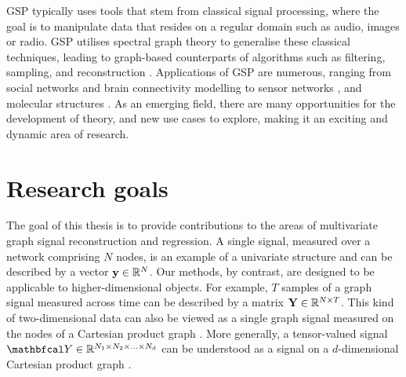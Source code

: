 \phantom{In this thesis we are  }
\vspace{-0.3cm}

GSP typically uses tools that stem from classical signal processing, where the goal is to manipulate data that resides on a regular domain such as audio, images or radio. GSP utilises spectral graph theory to generalise these classical techniques, leading to graph-based counterparts of algorithms such as filtering, sampling, and reconstruction \citep{Shuman2013}. Applications of GSP are numerous, ranging from social networks \citep{Dong2015} and brain connectivity modelling \citep{Huang2016} to sensor networks \citep{Zhu2012}, and molecular structures \citep{Kearnes2016}. As an emerging field, there are many opportunities for the development of theory, and new use cases to explore, making it an exciting and dynamic area of research. 

\section{Research goals}


The goal of this thesis is to provide contributions to the areas of multivariate graph signal reconstruction and regression. A single signal, measured over a network comprising $N$ nodes, is an example of a univariate structure and can be described by a vector $\mathbf{y} \in \mathbb{R}^N$. Our methods, by contrast, are designed to be applicable to higher-dimensional objects. For example, $T$ samples of a graph signal measured across time can be described by a matrix $\mathbf{Y} \in \mathbb{R}^{N \times T}$. This kind of two-dimensional data can also be viewed as a single graph signal measured on the nodes of a Cartesian product graph \citep{Imrich2000}. More generally, a tensor-valued signal $\Yt \in \R^{N_1 \times N_2 \times ... \times N_d}$ can be understood as a signal on a $d$-dimensional Cartesian product graph \citep{Stanley2020}. 


